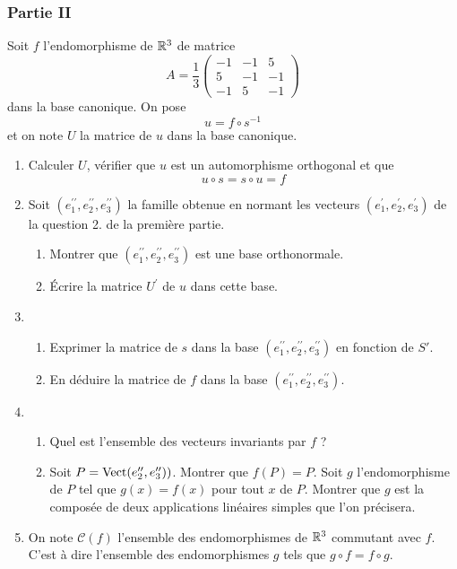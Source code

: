\subsubsection*{Partie II}
Soit $f$ l'endomorphisme de $\mathbb{R}^3$ de matrice
\begin{displaymath}
A = \frac{1}{3}\left( \begin{array}{ccc}
-1 & -1 & 5 \\ 
5 & -1 & -1 \\ 
-1 & 5 & -1
    \end{array}\right) 
\end{displaymath}
dans la base canonique. On pose
\[u=f\circ s^{-1}\]
et on note $U$ la matrice de $u$ dans la base canonique.
\begin{enumerate}
 \item Calculer $U$, vérifier que $u$ est un automorphisme orthogonal et que 
\[u\circ s= s\circ u=f\]
\item Soit $(e^{\prime\prime}_1, e^{\prime\prime}_2, e^{\prime\prime}_3)$ la famille obtenue en normant les vecteurs $(e^\prime _1, e^\prime _2, e^\prime _3)$ de la question 2. de la première partie.
\begin{enumerate}
 \item Montrer que $(e^{\prime\prime}_1, e^{\prime\prime}_2, e^{\prime\prime}_3)$ est une base orthonormale.
\item \'Ecrire la matrice $U^\prime$ de $u$ dans cette base.
\end{enumerate}
\item \begin{enumerate}
 \item Exprimer la matrice de $s$ dans la base $(e^{\prime\prime}_1, e^{\prime\prime}_2, e^{\prime\prime}_3)$ en fonction de $S'$.
\item En déduire la matrice de $f$ dans la base $(e^{\prime\prime}_1, e^{\prime\prime}_2, e^{\prime\prime}_3)$.
\end{enumerate}
\item \begin{enumerate}
 \item Quel est l'ensemble des vecteurs invariants par $f$ ?
\item Soit $P=\operatorname{Vect}(e^{\prime\prime}_2, e^{\prime\prime}_3))$. Montrer que $f(P)=P$. Soit $g$ l'endomorphisme de $P$ tel que $g(x)=f(x)$ pour tout $x$ de $P$. Montrer que $g$ est la composée de deux applications linéaires simples que l'on précisera.
\end{enumerate}
\item On note $\mathcal{C}(f)$ l'ensemble des endomorphismes de $\mathbb{R}^3$ commutant avec $f$. C'est à dire l'ensemble des endomorphismes $g$ tels que $g\circ f= f\circ g$.

\end{enumerate}
